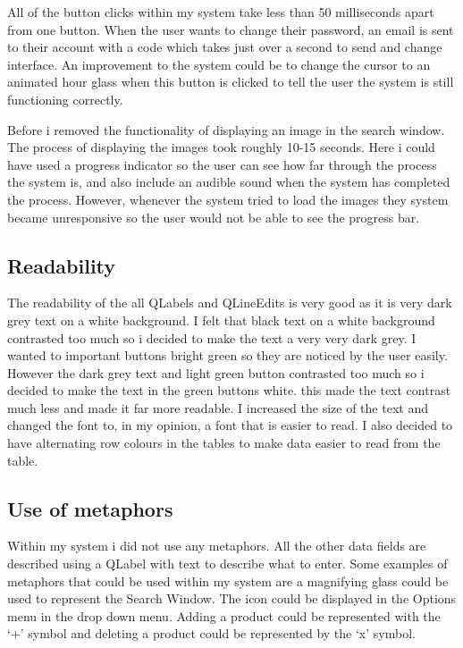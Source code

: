 All of the button clicks within my system take less than 50 milliseconds apart from one button. When the user wants to change their password, an email is sent to their account with a code which takes just over a second to send and change interface. An improvement to the system could be to change the cursor to an animated hour glass when this button is clicked to tell the user the system is still functioning correctly.

Before i removed the functionality of displaying an image in the search window. The process of displaying the images took roughly 10-15 seconds. Here i could have used a progress indicator so the user can see how far through the process the system is, and also include an audible sound when the system has completed the process. However, whenever the system tried to load the images they system became unresponsive so the user would not be able to see the progress bar.

\subsection{Readability}

The readability of the all QLabels and QLineEdits is very good as it is very dark grey text on a white background. I felt that black text on a white background contrasted too much so i decided to make the text a very very dark grey. I wanted to important buttons bright green so they are noticed by the user easily. However the dark grey text and light green button contrasted too much so i decided to make the text in the green buttons white. this made the text contrast much less and made it far more readable. I increased the size of the text and changed the font to, in my opinion, a font that is easier to read. I also decided to have alternating row colours in the tables to make data easier to read from the table.


\subsection{Use of metaphors}

Within my system i did not use any metaphors. All the other data fields are described using a QLabel with text to describe what to enter. Some examples of metaphors that could be used within my system are a magnifying glass could be used to represent the Search Window. The icon could be displayed in the Options menu in the drop down menu. Adding a product could be represented with the `+' symbol and deleting a product could be represented by the `x' symbol. 

